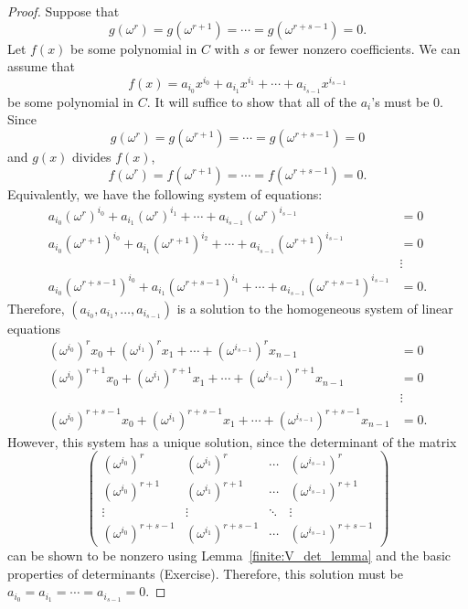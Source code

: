 \begin{proof}
Suppose that 
\[
g( \omega^r) = g(\omega^{r+1}) = \cdots = g( \omega^{r+s-1}) = 0.
\]
Let $f(x)$ be some polynomial in $C$ with $s$ or fewer nonzero coefficients.  We can assume that 
\[
f(x) = a_{i_0} x^{i_0} + a_{i_1} x^{i_1} + \cdots + a_{i_{s-1}}
x^{i_{s-1}} 
\]
be some polynomial in $C$. It will suffice to show that all of the $a_i$'s must be 0.  Since 
\[
g( \omega^r) = g(\omega^{r+1}) = \cdots = g( \omega^{r+s-1}) = 0
\]
and $g(x)$ divides $f(x)$,
\[
f( \omega^r) = f(\omega^{r+1}) = \cdots = f( \omega^{r+s-1}) = 0.
\]
Equivalently, we have the following system of equations:
\begin{align*}
a_{i_0} (\omega^r)^{i_0} + a_{i_1} (\omega^r)^{i_1} + \cdots +
a_{i_{s-1}} (\omega^r)^{i_{s-1}} & = 0 \\ 
a_{i_0} (\omega^{r+1})^{i_0} + a_{i_1} (\omega^{r+1})^{i_2} + \cdots +
a_{i_{s-1}} (\omega^{r+1})^{i_{s-1}} & = 0 \\ 
& \vdots  \\
a_{i_0} (\omega^{r+s-1})^{i_0} + a_{i_1} (\omega^{r+s-1})^{i_1} +
\cdots + a_{i_{s-1}} (\omega^{r+s-1})^{i_{s-1}} & = 0.
\end{align*}
Therefore, $(a_{i_0}, a_{i_1}, \ldots, a_{i_{s-1}})$ is a solution to the homogeneous system of linear equations
\begin{align*}
(\omega^{i_0})^r x_0 + (\omega^{i_1})^r x_1 + \cdots +
(\omega^{i_{s-1}})^r x_{n-1} & = 0 \\ 
(\omega^{i_0})^{r+1} x_0 + (\omega^{i_1})^{r+1} x_1 + \cdots +
(\omega^{i_{s-1}})^{r+1} x_{n-1} & = 0 \\ 
& \vdots  \\
(\omega^{i_0})^{r+s-1} x_0 + (\omega^{i_1})^{r+s-1} x_1 + \cdots +
(\omega^{i_{s-1}})^{r+s-1} x_{n-1} & = 0.
\end{align*}
However, this system has a unique solution, since the determinant of the matrix
\[
\begin{pmatrix}
(\omega^{i_0})^r & (\omega^{i_1})^r & \cdots & (\omega^{i_{s-1}})^r \\
(\omega^{i_0})^{r+1} & (\omega^{i_1})^{r+1} & \cdots &
(\omega^{i_{s-1}})^{r+1} \\
\vdots & \vdots         & \ddots & \vdots \\
(\omega^{i_0})^{r+s-1} & (\omega^{i_1})^{r+s-1} & \cdots &
(\omega^{i_{s-1}})^{r+s-1} 
\end{pmatrix}
\]
can be shown to be nonzero using Lemma~\ref{finite:V_det_lemma} and the basic properties of determinants (Exercise).   Therefore, 
this solution must be $a_{i_0} = a_{i_1} = \cdots = a_{i_{s-1}} = 0$.  
\end{proof}



